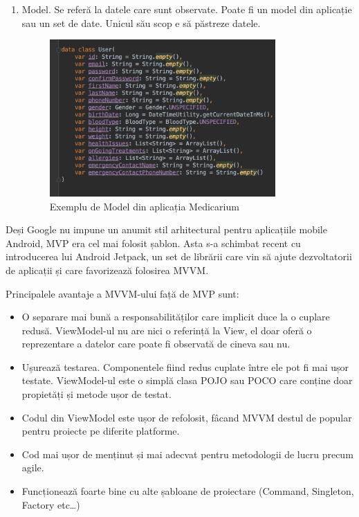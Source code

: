 \documentclass[12pt]{article}
\begin{document}
\begin{enumerate}
    \item Model. Se referă la datele care sunt observate. Poate
    fi un model din aplicație sau un set de date. Unicul său scop
    e să păstreze datele.


    \begin{figure}[H]
        \centering
        \includegraphics[height=6cm]{model.png}
        \caption{Exemplu de Model din aplicația Medicarium}
        \end{figure}

\end{enumerate}

Deși Google nu impune un anumit stil arhitectural pentru aplicațiile mobile Android, MVP
era cel mai folosit șablon. Asta s-a schimbat recent cu introducerea lui Android
Jetpack, un set de librării care vin să ajute dezvoltatorii de aplicații și care
favorizează folosirea MVVM.

Principalele avantaje a MVVM-ului față de MVP sunt:
\begin{itemize}
    \item O separare mai bună a responsabilităților care implicit duce la o cuplare
    redusă. ViewModel-ul nu are nici o referință la View, el doar oferă o reprezentare
    a datelor care poate fi observată de cineva sau nu.
    \item Ușurează testarea. Componentele fiind redus cuplate între ele pot fi 
    mai ușor testate. ViewModel-ul este o simplă clasa POJO sau POCO care conține
    doar propietăți și metode ușor de testat.
    \item Codul din ViewModel este ușor de refolosit, fâcand MVVM destul de popular pentru proiecte pe diferite platforme.
    \item Cod mai ușor de menținut și mai adecvat pentru metodologii de lucru precum
    agile.
    \item Funcționează foarte bine cu alte șabloane de proiectare (Command, Singleton, 
    Factory etc\dots)

\end{itemize}
\end{document}
